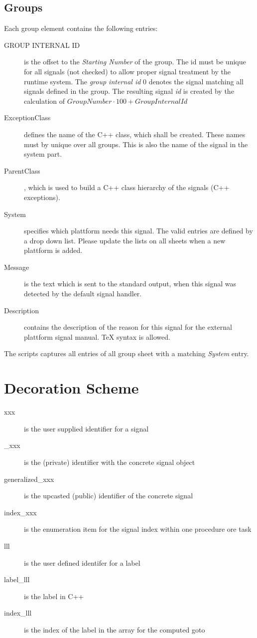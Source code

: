 \subsection{Groups}
Each group element contains the following entries:
\begin{description}
\item[GROUP INTERNAL ID] is the offset to the {\em Starting Number} of the 
   group. The id must be unique for all signals (not checked) to allow
   proper signal treatment by the runtime system.
   The {\em group internal id} 0 denotes the signal matching
   all signals defined in the group.
   The resulting signal {\em id} is created by the calculation of
   $GroupNumber \cdot 100 + GroupInternalId$
 
\item[ExceptionClass] defines the name of the C++ class, which shall be created.
   These names must by unique over all groups. This is also the name of
   the signal in the system part.
\item[ParentClass], which is used to build a C++ class hierarchy of the
    signals (C++ exceptions).
\item[System] specifies which plattform needs this signal. 
   The valid entries are defined by a drop down list. Please update the lists 
   on all sheets when a new plattform is added.
\item[Message] is the text which is sent to the standard output, when this
    signal was detected by the default signal handler.
\item[Description] contains the description of the reason for this signal
   for the external plattform signal manual. TeX syntax is allowed.
\end{description}

The scripts captures all entries of all group sheet with a matching
{\em System} entry.

\section{Decoration Scheme}
\begin{description}
\item[xxx] is the user supplied identifier for a signal
\item[\_xxx] is the (private) identifier with the concrete signal object
\item[generalized\_xxx] is the upcasted (public) identifier 
    of the concrete signal
\item[index\_xxx] is the enumeration item for the signal index within
   one procedure ore task

\item[lll] is the user defined identifer for a label 
\item[label\_lll] is the label in C++
\item[index\_lll] is the index of the label in the array for the computed goto

\end{description}

